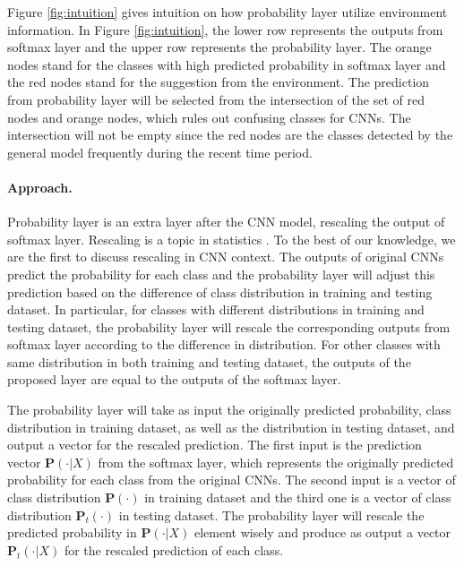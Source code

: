 \documentclass[pageno]{jpaper}
\begin{document}
Figure \ref{fig:intuition} gives intuition on how probability layer utilize environment information. In Figure \ref{fig:intuition}, the lower row represents the outputs from softmax layer and the upper row represents the probability layer. The orange nodes stand for the classes with high predicted probability in softmax layer and the red nodes stand for the suggestion from the environment. The prediction from probability layer will be selected from the intersection of the set of red nodes and orange nodes, which rules out confusing classes for CNNs. The intersection will not be empty since the red nodes are the classes detected by the general model frequently during the recent time period.



\paragraph{Approach. } Probability layer is an extra layer after the CNN model, rescaling the output of softmax layer. Rescaling is a topic in statistics \cite{saerens2002adjusting}. To the best of our knowledge, we are the first to discuss rescaling in CNN context. The outputs of original CNNs predict the probability for each class and the probability layer will adjust this prediction based on the difference of class distribution in training and testing dataset. In particular, for classes with different distributions in training and testing dataset, the probability layer will rescale the corresponding outputs from softmax layer according to the difference in distribution. For other classes with same distribution in both training and testing dataset, the outputs of the proposed layer are equal to the outputs of the softmax layer. 


The probability layer will take as input the originally predicted probability, class distribution in training dataset, as well as the distribution in testing dataset, and output a vector for the rescaled prediction. The first input is the prediction vector $\mathbf{P}(\cdot|X)$ from the softmax layer, which represents the originally predicted probability for each class from the original CNNs. The second input is a vector of class distribution $\mathbf{P}(\cdot)$ in training dataset and the third one is a vector of class distribution $\mathbf{P}_t(\cdot)$ in testing dataset. The probability layer will rescale the predicted probability in $\mathbf{P}(\cdot|X)$ element wisely and produce as output a vector $\mathbf{P}_t(\cdot|X)$ for the rescaled prediction of each class.
\end{document}
